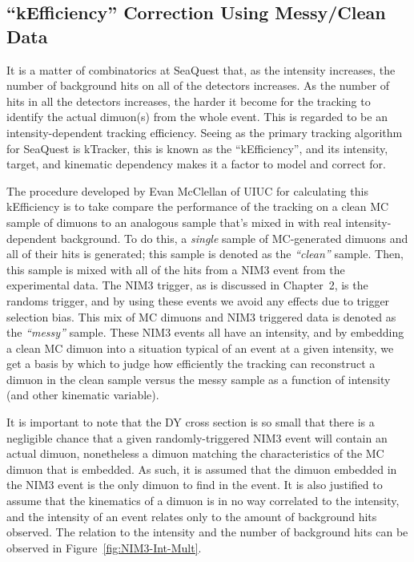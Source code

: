 \subsection{``kEfficiency'' Correction Using Messy/Clean Data}

It is a matter of combinatorics at SeaQuest that, as the intensity increases, the number of background hits on all of the detectors increases. As the number of hits in all the detectors increases, the harder it become for the tracking to identify the actual dimuon(s) from the whole event. This is regarded to be an intensity-dependent tracking efficiency. Seeing as the primary tracking algorithm for SeaQuest is kTracker, this is known as the ``kEfficiency'', and its intensity, target, and kinematic dependency makes it a factor to model and correct for.

The procedure developed by Evan McClellan of UIUC for calculating this kEfficiency is to take compare the performance of the tracking on a clean MC sample of dimuons to an analogous sample that's mixed in with real intensity-dependent background. To do this, a \emph{single} sample of MC-generated dimuons and all of their hits is generated; this sample is denoted as the \emph{``clean''} sample. Then, this sample is mixed with all of the hits from a NIM3 event from the experimental data. The NIM3 trigger, as is discussed in Chapter~2, is the randoms trigger, and by using these events we avoid any effects due to trigger selection bias. This mix of MC dimuons and NIM3 triggered data is denoted as the \emph{``messy''} sample. These NIM3 events all have an intensity, and by embedding a clean MC dimuon into a situation typical of an event at a given intensity, we get a basis by which to judge how efficiently the tracking can reconstruct a dimuon in the clean sample versus the messy sample as a function of intensity (and other kinematic variable).

It is important to note that the DY cross section is so small that there is a negligible chance that a given randomly-triggered NIM3 event will contain an actual dimuon, nonetheless a dimuon matching the characteristics of the MC dimuon that is embedded. As such, it is assumed that the dimuon embedded in the NIM3 event is the only dimuon to find in the event. It is also justified to assume that the kinematics of a dimuon is in no way correlated to the intensity, and the intensity of an event relates only to the amount of background hits observed. The relation to the intensity and the number of background hits can be observed in Figure~\ref{fig:NIM3-Int-Mult}.

